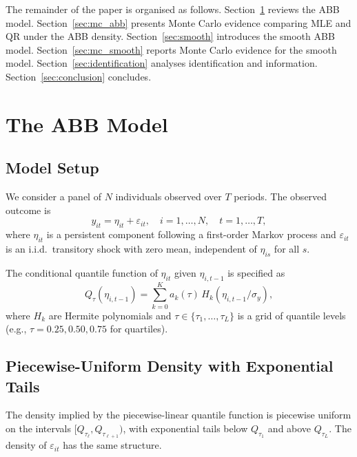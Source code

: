 \documentclass[12pt]{article}
\begin{document}
The remainder of the paper is organised as follows.
Section~\ref{sec:abb} reviews the ABB model.
Section~\ref{sec:mc_abb} presents Monte Carlo evidence comparing MLE and QR
under the ABB density.
Section~\ref{sec:smooth} introduces the smooth ABB model.
Section~\ref{sec:mc_smooth} reports Monte Carlo evidence for the smooth model.
Section~\ref{sec:identification} analyses identification and information.
Section~\ref{sec:conclusion} concludes.

\section{The ABB Model}
\label{sec:abb}

\subsection{Model Setup}

We consider a panel of $N$ individuals observed over $T$ periods.
The observed outcome is
\begin{equation}\label{eq:model}
y_{it} = \eta_{it} + \varepsilon_{it}, \quad i=1,\ldots,N, \quad t=1,\ldots,T,
\end{equation}
where $\eta_{it}$ is a persistent component following a first-order Markov
process and $\varepsilon_{it}$ is an i.i.d.\ transitory shock with zero mean,
independent of $\eta_{is}$ for all $s$.

The conditional quantile function of $\eta_{it}$ given $\eta_{i,t-1}$ is
specified as
\begin{equation}\label{eq:quantile}
Q_\tau(\eta_{i,t-1}) = \sum_{k=0}^K a_{k}(\tau)\, H_k(\eta_{i,t-1}/\sigma_y),
\end{equation}
where $H_k$ are Hermite polynomials and $\tau \in \{\tau_1, \ldots, \tau_L\}$
is a grid of quantile levels (e.g., $\tau = 0.25, 0.50, 0.75$ for quartiles).

\subsection{Piecewise-Uniform Density with Exponential Tails}

The density implied by the piecewise-linear quantile function is
piecewise uniform on the intervals $[Q_{\tau_\ell}, Q_{\tau_{\ell+1}})$,
with exponential tails below $Q_{\tau_1}$ and above $Q_{\tau_L}$.
The density of $\varepsilon_{it}$ has the same structure.
\end{document}
